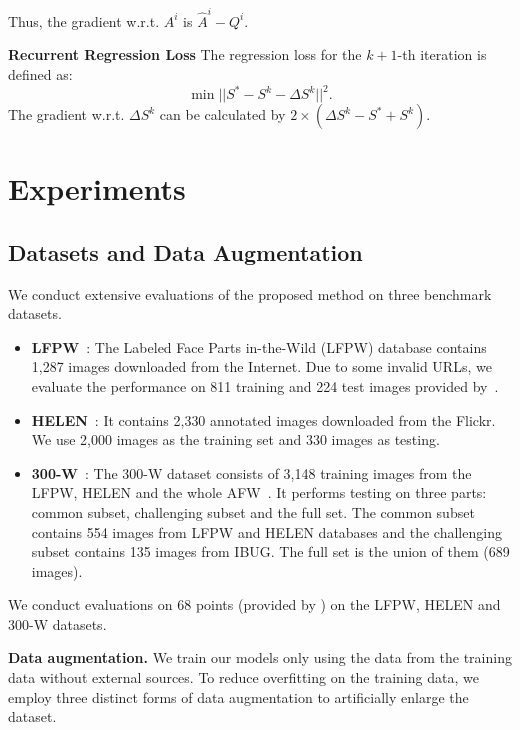 \documentclass[journal]{IEEEtran}
\begin{document}
Thus, the gradient w.r.t. $A^i$ is $\hat{A}^i - Q^i$.

\textbf{Recurrent Regression Loss} The regression loss for the $k+1$-th iteration is defined as:
\begin{equation}
\min ||S^{*} - S^k - \Delta S^k||^2.
\label{least_squares}
\end{equation}
The gradient w.r.t. $\Delta S^k$ can be calculated by $2 \times (\Delta S^k - S^{*} + S^k)$.


\section{Experiments}
\label{experiments}

\subsection{Datasets and Data Augmentation}

We conduct extensive evaluations of the proposed method on three benchmark datasets.
\begin{itemize}
\item \textbf{LFPW}~\cite{lfpw}: The Labeled Face Parts in-the-Wild (LFPW) database contains 1,287 images downloaded from the Internet. Due to some invalid URLs, we evaluate the performance on 811 training and 224 test images provided by~\cite{300w}.

\item \textbf{HELEN}~\cite{helen}: It contains 2,330 annotated images downloaded from the Flickr. We use 2,000 images as the training set and 330 images as testing.

\item \textbf{300-W}~\cite{300w}: The 300-W dataset consists of 3,148 training images from the LFPW, HELEN and the whole AFW~\cite{zhu2012face}. It performs testing on three parts: common subset, challenging subset and the full set. The common subset contains 554 images from LFPW and HELEN databases and the challenging subset contains 135 images from IBUG. The full set is the union of them (689 images).
\end{itemize}

We conduct evaluations on 68 points (provided by \cite{300w}) on the LFPW, HELEN and 300-W  datasets.

\textbf{Data augmentation.}
We train our models only using the data from the training data without external sources. To reduce overfitting on the training data, we employ three distinct forms of data augmentation to artificially enlarge the dataset.
\end{document}
